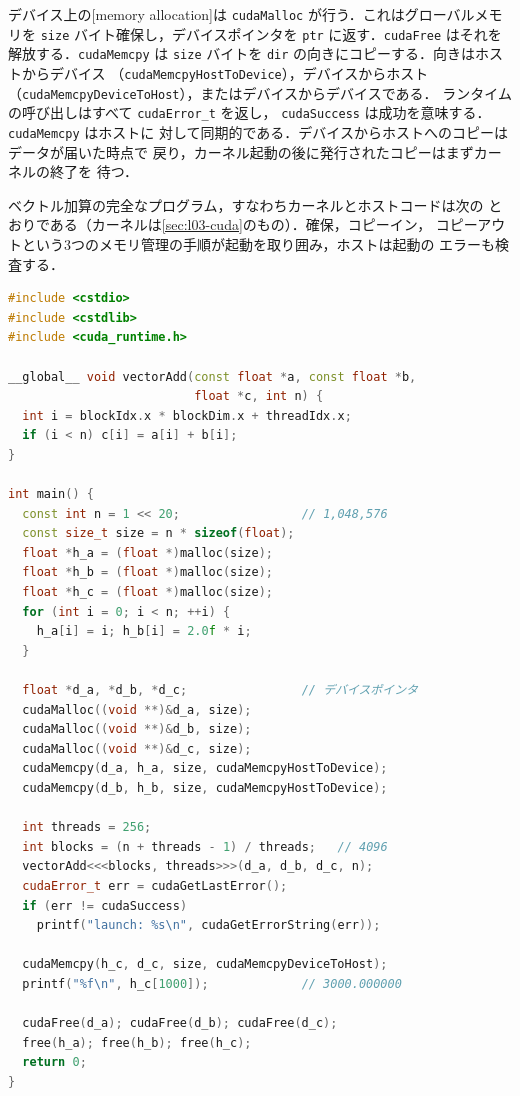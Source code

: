 \documentclass[../main.tex]{subfiles}
\begin{document}
\begin{definition}[メモリ確保と転送]
  デバイス上の[memory allocation]は
  \texttt{cudaMalloc} が行う．これはグローバルメモリを \texttt{size}
  バイト確保し，デバイスポインタを \texttt{ptr} に返す．\texttt{cudaFree}
  はそれを解放する．\texttt{cudaMemcpy} は \texttt{size} バイトを
  \texttt{dir} の向きにコピーする．向きはホストからデバイス
  （\texttt{cudaMemcpyHostToDevice}），デバイスからホスト
  （\texttt{cudaMemcpyDeviceToHost}），またはデバイスからデバイスである．
  ランタイムの呼び出しはすべて \texttt{cudaError\_t} を返し，
  \texttt{cudaSuccess} は成功を意味する．\texttt{cudaMemcpy} はホストに
  対して同期的である．デバイスからホストへのコピーはデータが届いた時点で
  戻り，カーネル起動の後に発行されたコピーはまずカーネルの終了を
  待つ．
\end{definition}

ベクトル加算の完全なプログラム，すなわちカーネルとホストコードは次の
とおりである（カーネルは\cref{sec:l03-cuda}のもの）．確保，コピーイン，
コピーアウトという3つのメモリ管理の手順が起動を取り囲み，ホストは起動の
エラーも検査する．
\begin{lstlisting}[language=C++, numbers=none]
#include <cstdio>
#include <cstdlib>
#include <cuda_runtime.h>

__global__ void vectorAdd(const float *a, const float *b,
                          float *c, int n) {
  int i = blockIdx.x * blockDim.x + threadIdx.x;
  if (i < n) c[i] = a[i] + b[i];
}

int main() {
  const int n = 1 << 20;                 // 1,048,576
  const size_t size = n * sizeof(float);
  float *h_a = (float *)malloc(size);
  float *h_b = (float *)malloc(size);
  float *h_c = (float *)malloc(size);
  for (int i = 0; i < n; ++i) {
    h_a[i] = i; h_b[i] = 2.0f * i;
  }

  float *d_a, *d_b, *d_c;                // デバイスポインタ
  cudaMalloc((void **)&d_a, size);
  cudaMalloc((void **)&d_b, size);
  cudaMalloc((void **)&d_c, size);
  cudaMemcpy(d_a, h_a, size, cudaMemcpyHostToDevice);
  cudaMemcpy(d_b, h_b, size, cudaMemcpyHostToDevice);

  int threads = 256;
  int blocks = (n + threads - 1) / threads;   // 4096
  vectorAdd<<<blocks, threads>>>(d_a, d_b, d_c, n);
  cudaError_t err = cudaGetLastError();
  if (err != cudaSuccess)
    printf("launch: %s\n", cudaGetErrorString(err));

  cudaMemcpy(h_c, d_c, size, cudaMemcpyDeviceToHost);
  printf("%f\n", h_c[1000]);             // 3000.000000

  cudaFree(d_a); cudaFree(d_b); cudaFree(d_c);
  free(h_a); free(h_b); free(h_c);
  return 0;
}
\end{lstlisting}
\end{document}
